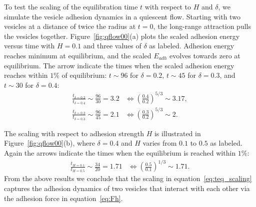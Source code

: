 \documentclass[prf,superscriptaddress,showpacs]{revtex4-1}
\begin{document}
To test the scaling of the equilibration time $t$ with respect to $H$
and $\delta$, we simulate the vesicle adhesion dynamics in a quiescent
flow.  Starting with two vesicles at a distance of twice the radius at
$t=0$, the long-range attraction pulls the vesicles together.
Figure~\ref{fig:qflow00}(a) plots the scaled adhesion energy versus time
with $H=0.1$ and three values of $\delta$ as labeled.  Adhesion energy
reaches minimum at equilibrium, and the scaled $E_{adh}$ evolves towards
zero at equilibrium.  The arrow indicate the times when the scaled
adhesion energy reaches within $1\%$ of equilibrium: $t\sim 96$ for
$\delta=0.2$, $t\sim 45$ for $\delta = 0.3$, and $t\sim 30$ for
$\delta=0.4$:
\begin{align*}
\frac{t_{\delta=0.2}}{t_{\delta=0.4}} \sim \frac{96}{30}=3.2 &\Longleftrightarrow \left(\frac{0.4}{0.2}\right)^{5/3}\sim 3.17,\\
\frac{t_{\delta=0.2}}{t_{\delta=0.3}} \sim \frac{96}{45}=2.1 &\Longleftrightarrow \left(\frac{0.3}{0.2}\right)^{5/3}\sim 2.
\end{align*}

The scaling with respect to adhesion strength $H$ is illustrated in
Figure~\ref{fig:qflow00}(b), where $\delta = 0.4$ and $H$ varies from
$0.1$ to $0.5$ as labeled.  Again the arrows indicate the times when the
equilibrium is reached within $1\%$:
\begin{align*}
\frac{t_{H=0.1}}{t_{H=0.5}} \sim \frac{34}{20} = 1.71 &\Longleftrightarrow \left(\frac{0.5}{0.1}\right)^{1/3}\sim 1.71.
\end{align*}
From the above results we conclude that the scaling in
equation~\eqref{eq:teq_scaling} captures the adhesion dynamics of two
vesicles that interact with each other via the adhesion force in
equation~\eqref{eq:Fh}.
\end{document}
